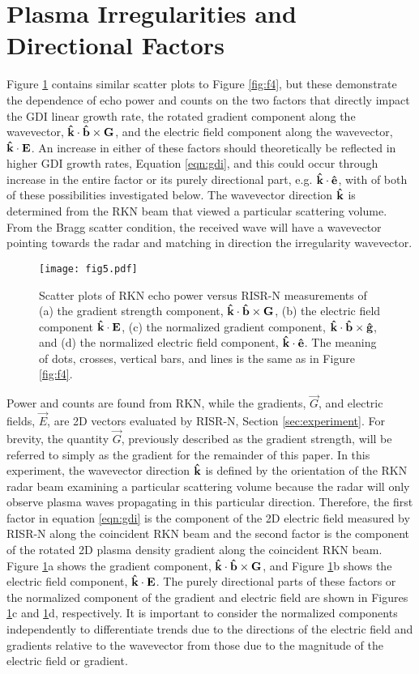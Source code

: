 \section{Plasma Irregularities and Directional Factors}
Figure \ref{fig:f5} contains similar scatter plots to Figure \ref{fig:f4}, but these demonstrate the dependence of echo power and counts on the two factors that directly impact the GDI linear growth rate, the rotated gradient component along the wavevector, \(\mathbf{\hat{k}}\cdot\mathbf{\hat{b}}\times\mathbf{G}\), and the electric field component along the wavevector, \(\mathbf{\hat{k}}\cdot\mathbf{E}\). An increase in either of these factors should theoretically be reflected in higher GDI growth rates, Equation \ref{eqn:gdi}, and this could occur through increase in the entire factor or its purely directional part, e.g. \(\mathbf{\hat{k}}\cdot\mathbf{\hat{e}}\), with of both of these possibilities investigated below. The wavevector direction \(\mathbf{\hat{k}}\) is determined from the RKN beam that viewed a particular scattering volume.  From the Bragg scatter condition, the received wave will have a wavevector pointing towards the radar and matching in direction the irregularity wavevector.

\begin{figure}
	\texttt{[image: fig5.pdf]}
  \caption{Scatter plots of RKN echo power versus RISR-N measurements of (a) the gradient strength component, \(\mathbf{\hat{k}}\cdot\mathbf{\hat{b}}\times\mathbf{G}\), (b) the electric field component \(\mathbf{\hat{k}}\cdot\mathbf{E}\), (c) the normalized gradient component, \(\mathbf{\hat{k}}\cdot\mathbf{\hat{b}}\times\mathbf{\hat{g}}\), and (d) the normalized electric field component, \(\mathbf{\hat{k}}\cdot\mathbf{\hat{e}}\). The meaning of dots, crosses, vertical bars, and lines is the same as in Figure \ref{fig:f4}.}
  \label{fig:f5}
\end{figure}

Power and counts are found from RKN, while the gradients, \(\vec{G}\), and electric fields, \(\vec{E}\), are 2D vectors evaluated by RISR-N, Section \ref{sec:experiment}. For brevity, the quantity \(\vec{G}\), previously described as the gradient strength, will be referred to simply as the gradient for the remainder of this paper.  In this experiment, the wavevector direction \(\mathbf{\hat{k}}\) is defined by the orientation of the RKN radar beam examining a particular scattering volume because the radar will only observe plasma waves propagating in this particular direction. Therefore, the first factor in equation \ref{eqn:gdi} is the component of the 2D electric field measured by RISR-N along the coincident RKN beam and the second factor is the component of the rotated 2D plasma density gradient along the coincident RKN beam.  Figure \ref{fig:f5}a shows the gradient component, \(\mathbf{\hat{k}}\cdot\mathbf{\hat{b}}\times\mathbf{G}\), and Figure \ref{fig:f5}b shows the electric field component, \(\mathbf{\hat{k}}\cdot\mathbf{E}\).  The purely directional parts of these factors or the normalized component of the gradient and electric field are shown in Figures \ref{fig:f5}c and \ref{fig:f5}d, respectively.  It is important to consider the normalized components independently to differentiate trends due to the directions of the electric field and gradients relative to the wavevector from those due to the magnitude of the electric field or gradient.

